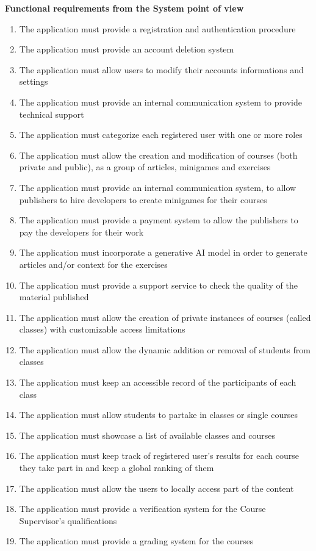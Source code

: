 \textbf{Functional requirements from the System point of view}
\begin{enumerate}[start=31,label={\bfseries FR \arabic*.}]
	\item The application must provide a registration and authentication procedure
	\item The application must provide an account deletion system
	\item The application must allow users to modify their accounts informations and settings
	\item The application must provide an internal communication system to provide technical support
	\item The application must categorize each registered user with one or more roles
	\item The application must allow the creation and modification of courses (both private and public), as a group of articles, minigames and exercises
	\item The application must provide an internal communication system, to allow publishers to hire developers to create minigames for their courses
	\item The application must provide a payment system to allow the publishers to pay the developers for their work
	\item The application must incorporate a generative AI model in order to generate articles and/or context for the exercises
	\item The application must provide a support service to check the quality of the material published
	\item The application must allow the creation of private instances of courses (called classes) with customizable access limitations
	\item The application must allow the dynamic addition or removal of students from classes
	\item The application must keep an accessible record of the participants of each class
	\item The application must allow students to partake in classes or single courses
	\item The application must showcase a list of available classes and courses
	\item The application must keep track of registered user’s results for each course they take part in and keep a global ranking of them
	\item The application must allow the users to locally access part of the content
	\item The application must provide a verification system for the Course Supervisor’s qualifications
	\item The application must provide a grading system for the courses
\end{enumerate}


